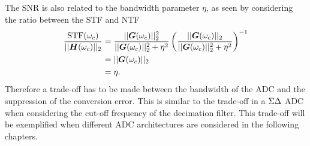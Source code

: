 The SNR is also related to the bandwidth parameter $\eta$, as seen by considering the ratio between the STF and NTF
\begin{align}
    \frac{\text{STF}(\omega_c)}{||\bm{H}(\omega_c)||_2} &= \frac{||\bm{G}(\omega_c)||_{2}^2}{||\bm{G}(\omega_c)||_{2}^2 + \eta^2 } \left( \frac{||\bm{G}(\omega_c)||_{2}}{||\bm{G}(\omega_c)||_{2}^2 + \eta^2 } \right)^{-1} \label{eq:stf_eta_start}\\
    & = ||\bm{G}(\omega_c)||_{2} \\ &= \eta \label{eq:stf_eta_end}.
\end{align}
Therefore a trade-off has to be made between the bandwidth of the ADC and the suppression of the conversion error. This is similar to the trade-off in a $\Sigma\Delta$ ADC when considering the cut-off frequency of the decimation filter. This trade-off will be exemplified when different ADC architectures are considered in the following chapters.

